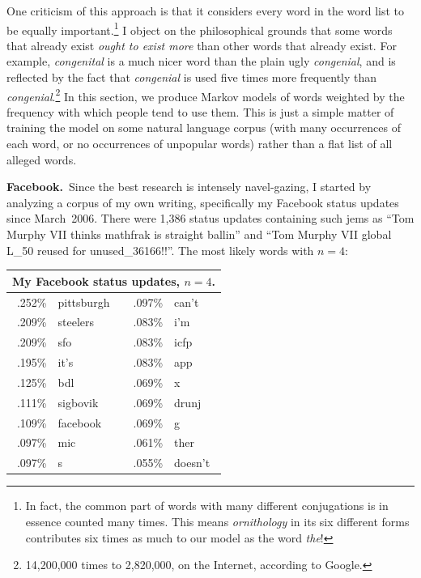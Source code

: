 \documentclass[twocolumn]{article}
\begin{document}
One criticism of this approach is that it considers every word in the
word list to be equally important.\!\footnote{In fact, the common part
  of words with many different conjugations is in essence counted many
  times. This means {\it ornithology} in its six different forms
  contributes six times as much to our model as the word {\it the}!} I
object on the philosophical grounds that some words that already exist
{\em ought to exist more} than other words that already exist. For
example, {\it congenital} is a much nicer word than the plain ugly
{\it congenial}, and is reflected by the fact that {\it congenial} is
used five times more frequently than {\it
  congenial}.\!\footnote{14,200,000 times to 2,820,000, on the
  Internet, according to Google.} In this section, we produce Markov
models of words weighted by the frequency with which people tend to
use them. This is just a simple matter of training the model on some
natural language corpus (with many occurrences of each word, or no
occurrences of unpopular words) rather than a flat list of all alleged
words.

{\bf Facebook.}\ Since the best research is intensely navel-gazing, I started by 
analyzing a corpus of my own writing, specifically my Facebook status
updates since March~2006. There were 1,386 status updates containing
such jems as ``Tom Murphy VII thinks mathfrak is straight ballin''
and ``Tom Murphy VII global L\_50 reused for unused\_36166!!''. The
most likely words with $n=4$:

\begin{center}
\begin{tabular}{rl@{\quad\quad}rl}
\multicolumn{4}{c}{My Facebook status updates, $n=4$.} \\
\hline
.252\% &  pittsburgh   & .097\% &  can't    \\   
.209\% &  steelers     & .083\% &  i'm      \\   
.209\% &  sfo          & .083\% &  icfp     \\   
.195\% &  it's         & .083\% &  app      \\   
.125\% &  bdl          & .069\% &  x        \\   
.111\% &  sigbovik     & .069\% &  drunj    \\   
.109\% &  facebook     & .069\% &  g        \\   
.097\% &  mic          & .061\% &  ther     \\   
.097\% &  s            & .055\% &  doesn't  \\
\end{tabular}
\end{center}
\end{document}
